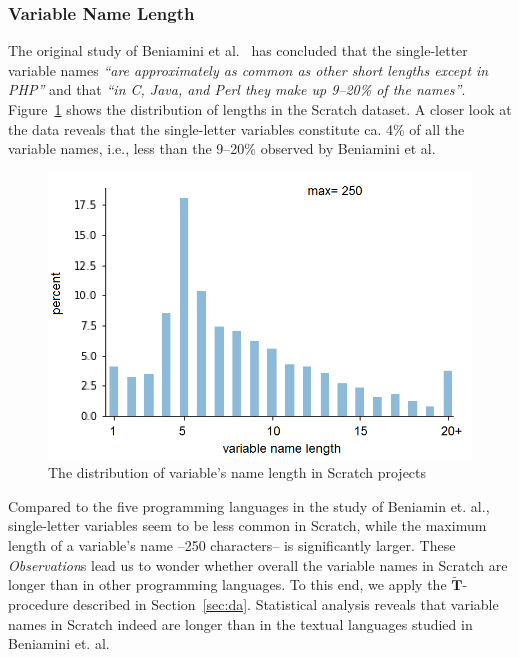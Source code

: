 \documentclass[conference]{IEEEtran}
\begin{document}
\subsubsection{Variable Name Length}
\label{res:var:length}
The original study of Beniamini et al.~\cite{Beniamini} has concluded that the single-letter variable names \emph{``are approximately as common as other short lengths except in PHP''} and that \emph{``in C, Java, and Perl they make up 9--20\% of the names''}. 
Figure~\ref{fig:distribution_of_lengths} shows the distribution of lengths in the Scratch dataset. A closer look at the data reveals that the single-letter variables constitute ca. 4\% of all the variable names, i.e., less than the 9--20\% observed by Beniamini et al.
\begin{figure}[tb]
	\begin{center}
		\includegraphics[scale=.3]{fig/project/distribution_var_name_length}
		\caption{The distribution of variable's name length in Scratch projects}
		\label{fig:distribution_of_lengths}
	\end{center}
\end{figure} 
Compared to the five programming languages in the study of Beniamin et. al., single-letter variables seem to be less common in Scratch, while the maximum length of a variable's name --250 characters-- is significantly larger. 
These \emph{Observation}s lead us to wonder whether overall the variable names in Scratch are longer than in other programming languages.
To this end, we apply the $\widetilde{\mathbf{T}}$-procedure described in Section~\ref{sec:da}. 
Statistical analysis reveals that variable names in Scratch indeed are longer than in the textual languages studied in Beniamini et. al.
\end{document}

